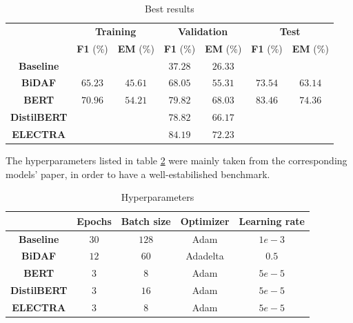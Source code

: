 \documentclass[a4paper,10pt]{report}
\begin{document}
\begin{table}[h]
  \center
  \begin{tabular}{|c|c|c|c|c|c|c|}
  \hline
  \multirow{2}{*}{}   & \multicolumn{2}{c|}{\textbf{Training}} & \multicolumn{2}{c|}{\textbf{Validation}} & \multicolumn{2}{c|}{\textbf{Test}} \\ \cline{2-7} 
                      & \textbf{F1} (\%) & \textbf{EM} (\%) & \textbf{F1} (\%) & \textbf{EM} (\%) & \textbf{F1} (\%) & \textbf{EM} (\%)     \\ \hline
  \textbf{Baseline}   &                    &                   & $37.28$           & $26.33$          &                  &                 \\ \hline
  \textbf{BiDAF}      & $65.23$            & $45.61$           & $68.05$           & $55.31$          & $73.54$          & $63.14$       \\ \hline
  \textbf{BERT}       & $70.96$            & $54.21$           & $79.82$           & $68.03$          & $83.46$          & $74.36$       \\ \hline
  \textbf{DistilBERT} &                    &                   & $78.82$           & $66.17$          &                  &                 \\ \hline
  \textbf{ELECTRA}    &                    &                   & $84.19$           & $72.23$          &                  &                 \\ \hline
  \end{tabular}
  \caption{Best results}
  \label{table:results}
\end{table}

The hyperparameters listed in table \ref{table:hyperparameters} were mainly taken from the corresponding models' paper, in order to have a well-estabilished benchmark. 

\begin{table}[h]
  \center
  \begin{tabular}{|c|c|c|c|c|}
  \hline
                      & \textbf{Epochs} & \textbf{Batch size} & \textbf{Optimizer} & \textbf{Learning rate} \\ \hline
  \textbf{Baseline}   & $30$            & $128$               & Adam               & $1e-3$                 \\ \hline
  \textbf{BiDAF}      & $12$            & $60$                & Adadelta           & $0.5$                  \\ \hline
  \textbf{BERT}       & $3$             & $8$                 & Adam               & $5e-5$                 \\ \hline
  \textbf{DistilBERT} & $3$             & $16$                & Adam               & $5e-5$                 \\ \hline
  \textbf{ELECTRA}    & $3$             & $8$                 & Adam               & $5e-5$                 \\ \hline
  \end{tabular}
  \caption{Hyperparameters}
  \label{table:hyperparameters}
\end{table}
\end{document}

